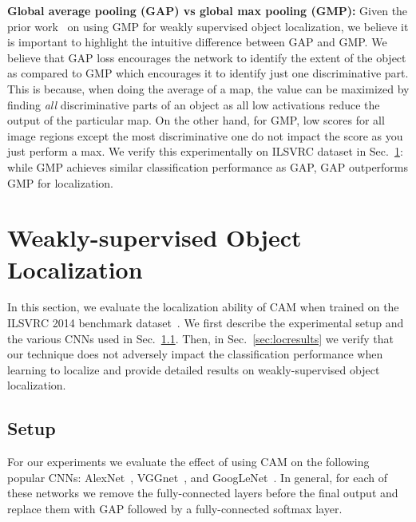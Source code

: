 \documentclass[10pt,twocolumn,letterpaper]{article}
\begin{document}
\textbf{Global average pooling (GAP) vs global max pooling (GMP):} Given the prior work~\cite{oquab2014weakly} on using GMP for weakly supervised object localization, we believe it is important to highlight the intuitive difference between GAP and GMP. We believe that GAP loss encourages the network to identify the extent of the object as compared to GMP which encourages it to identify just one discriminative part. This is because, when doing the average of a map, the value can be maximized by finding \textit{all} discriminative parts of an object as all low activations reduce the output of the particular map. On the other hand, for GMP, low scores for all image regions except the most discriminative one do not impact the score as you just perform a max. We verify this experimentally on ILSVRC dataset in Sec.~\ref{sec:weaklocalization}: while GMP achieves similar classification performance as GAP, GAP outperforms GMP for localization.

\section{Weakly-supervised Object Localization}
\label{sec:weaklocalization}
In this section, we evaluate the localization ability of CAM when trained on the ILSVRC 2014 benchmark dataset~\cite{ILSVRCijcv15}. We first describe the experimental setup and the various CNNs used in Sec.~\ref{sec:locsetup}. Then, in Sec.~\ref{sec:locresults} we verify that our technique does not adversely impact the classification performance when learning to localize and provide detailed results on weakly-supervised object localization.


\subsection{Setup}
\label{sec:locsetup}
For our experiments we evaluate the effect of using CAM on the following popular CNNs: AlexNet~\cite{krizhevsky2012imagenet}, VGGnet~\cite{simonyan2014very}, and GoogLeNet~\cite{szegedy2014going}. In general, for each of these networks we remove the fully-connected layers before the final output and replace them with GAP followed by a fully-connected softmax layer. 
\end{document}
